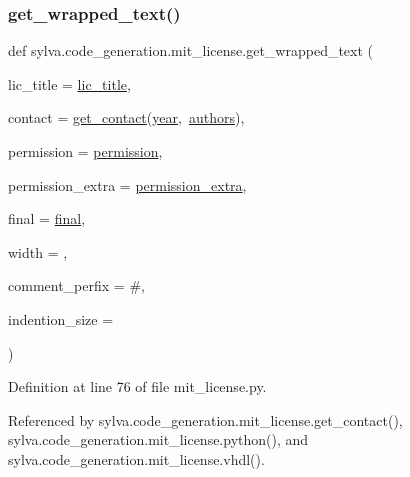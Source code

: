 \subsubsection{\texorpdfstring{get\+\_\+wrapped\+\_\+text()}{get\_wrapped\_text()}}
{\footnotesize\ttfamily def sylva.\+code\+\_\+generation.\+mit\+\_\+license.\+get\+\_\+wrapped\+\_\+text (\begin{DoxyParamCaption}\item[{}]{lic\+\_\+title = {\ttfamily \hyperlink{namespacesylva_1_1code__generation_1_1mit__license_a85aa303c71412d6df9e78ae4d0de5c28}{lic\+\_\+title}},  }\item[{}]{contact = {\ttfamily \hyperlink{namespacesylva_1_1code__generation_1_1mit__license_a7cf6054f669c578c4c64370849e8edc2}{get\+\_\+contact}(\hyperlink{namespacesylva_1_1code__generation_1_1mit__license_a4902e976e16e0ac4d890af277506dc41}{year},~\hyperlink{namespacesylva_1_1code__generation_1_1mit__license_ab235b5262a6f93e7dcdef3c73e16621a}{authors})},  }\item[{}]{permission = {\ttfamily \hyperlink{namespacesylva_1_1code__generation_1_1mit__license_af67ea5ac7bf8aeac183aefb908f601e2}{permission}},  }\item[{}]{permission\+\_\+extra = {\ttfamily \hyperlink{namespacesylva_1_1code__generation_1_1mit__license_ae51b5f9d271cf247681c95af29079e5a}{permission\+\_\+extra}},  }\item[{}]{final = {\ttfamily \hyperlink{namespacesylva_1_1code__generation_1_1mit__license_a27244f1a7bc13b260c9a5bed16b1d438}{final}},  }\item[{}]{width = {},  }\item[{}]{comment\+\_\+perfix = {\ttfamily \textquotesingle{}\#\textquotesingle{}},  }\item[{}]{indention\+\_\+size = {} }\end{DoxyParamCaption})}



Definition at line 76 of file mit\+\_\+license.\+py.



Referenced by sylva.\+code\+\_\+generation.\+mit\+\_\+license.\+get\+\_\+contact(), sylva.\+code\+\_\+generation.\+mit\+\_\+license.\+python(), and sylva.\+code\+\_\+generation.\+mit\+\_\+license.\+vhdl().


